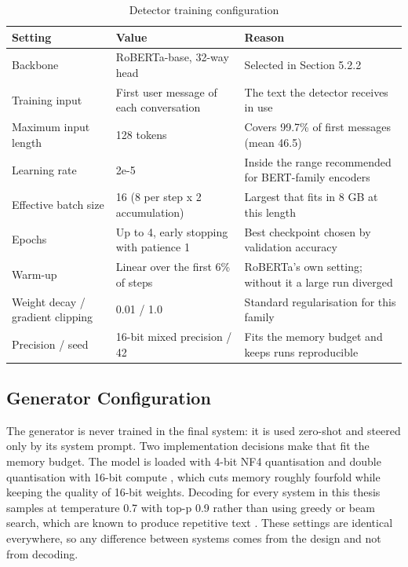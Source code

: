 \begin{table}[H]
\centering
\footnotesize
\begin{tabularx}{\textwidth}{@{}lXX@{}}
\toprule
\textbf{Setting} & \textbf{Value} & \textbf{Reason} \\
\midrule
Backbone & RoBERTa-base, 32-way head & Selected in Section 5.2.2 \\
Training input & First user message of each conversation & The text the detector receives in use \\
Maximum input length & 128 tokens & Covers 99.7\% of first messages (mean 46.5) \\
Learning rate & 2e-5 & Inside the range recommended for BERT-family encoders \\
Effective batch size & 16 (8 per step x 2 accumulation) & Largest that fits in 8 GB at this length \\
Epochs & Up to 4, early stopping with patience 1 & Best checkpoint chosen by validation accuracy \\
Warm-up & Linear over the first 6\% of steps & RoBERTa's own setting; without it a large run diverged \\
Weight decay / gradient clipping & 0.01 / 1.0 & Standard regularisation for this family \\
Precision / seed & 16-bit mixed precision / 42 & Fits the memory budget and keeps runs reproducible \\
\bottomrule
\end{tabularx}
\caption{Detector training configuration}
\label{tab:4.8}
\end{table}

\subsection{Generator Configuration}

The generator is never trained in the final system: it is used zero-shot and steered only by its system prompt. Two implementation decisions make that fit the memory budget. The model is loaded with 4-bit NF4 quantisation and double quantisation with 16-bit compute \cite{dettmers2023qlora}, which cuts memory roughly fourfold while keeping the quality of 16-bit weights. Decoding for every system in this thesis samples at temperature 0.7 with top-p 0.9 rather than using greedy or beam search, which are known to produce repetitive text \cite{holtzman2020}. These settings are identical everywhere, so any difference between systems comes from the design and not from decoding.

